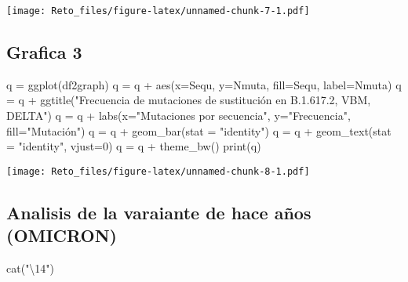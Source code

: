 \documentclass[
]{article}
\newenvironment{Shaded}{\begin{snugshade}}{\end{snugshade}}
\newcommand{\AttributeTok}[1]{\textcolor[rgb]{0.77,0.63,0.00}{#1}}
\newcommand{\DecValTok}[1]{\textcolor[rgb]{0.00,0.00,0.81}{#1}}
\newcommand{\FunctionTok}[1]{\textcolor[rgb]{0.00,0.00,0.00}{#1}}
\newcommand{\NormalTok}[1]{#1}
\newcommand{\OtherTok}[1]{\textcolor[rgb]{0.56,0.35,0.01}{#1}}
\newcommand{\SpecialCharTok}[1]{\textcolor[rgb]{0.00,0.00,0.00}{#1}}
\newcommand{\StringTok}[1]{\textcolor[rgb]{0.31,0.60,0.02}{#1}}
\begin{document}
\texttt{[image: Reto\_files/figure-latex/unnamed-chunk-7-1.pdf]}

\hypertarget{grafica-3}{%
\subsection{Grafica 3}\label{grafica-3}}

\begin{Shaded}
\begin{Highlighting}[]
\NormalTok{q }\OtherTok{=} \FunctionTok{ggplot}\NormalTok{(df2graph)}
\NormalTok{q }\OtherTok{=}\NormalTok{ q }\SpecialCharTok{+} \FunctionTok{aes}\NormalTok{(}\AttributeTok{x=}\NormalTok{Sequ, }\AttributeTok{y=}\NormalTok{Nmuta, }\AttributeTok{fill=}\NormalTok{Sequ, }\AttributeTok{label=}\NormalTok{Nmuta)}
\NormalTok{q }\OtherTok{=}\NormalTok{ q }\SpecialCharTok{+} \FunctionTok{ggtitle}\NormalTok{(}\StringTok{"Frecuencia de mutaciones de sustitución en B.1.617.2, VBM, DELTA"}\NormalTok{)}
\NormalTok{q }\OtherTok{=}\NormalTok{ q }\SpecialCharTok{+} \FunctionTok{labs}\NormalTok{(}\AttributeTok{x=}\StringTok{"Mutaciones por secuencia"}\NormalTok{, }\AttributeTok{y=}\StringTok{"Frecuencia"}\NormalTok{, }\AttributeTok{fill=}\StringTok{"Mutación"}\NormalTok{)}
\NormalTok{q }\OtherTok{=}\NormalTok{ q }\SpecialCharTok{+} \FunctionTok{geom\_bar}\NormalTok{(}\AttributeTok{stat =} \StringTok{"identity"}\NormalTok{)}
\NormalTok{q }\OtherTok{=}\NormalTok{ q }\SpecialCharTok{+} \FunctionTok{geom\_text}\NormalTok{(}\AttributeTok{stat =} \StringTok{"identity"}\NormalTok{, }\AttributeTok{vjust=}\DecValTok{0}\NormalTok{)}
\NormalTok{q }\OtherTok{=}\NormalTok{ q }\SpecialCharTok{+} \FunctionTok{theme\_bw}\NormalTok{()}
\FunctionTok{print}\NormalTok{(q)}
\end{Highlighting}
\end{Shaded}

\texttt{[image: Reto\_files/figure-latex/unnamed-chunk-8-1.pdf]}

\hypertarget{analisis-de-la-varaiante-de-hace-auxf1os-omicron}{%
\subsection{Analisis de la varaiante de hace años
(OMICRON)}\label{analisis-de-la-varaiante-de-hace-auxf1os-omicron}}

\begin{Shaded}
\begin{Highlighting}[]
\FunctionTok{cat}\NormalTok{(}\StringTok{"\textbackslash{}14"}\NormalTok{)}
\end{Highlighting}
\end{Shaded}
\end{document}
